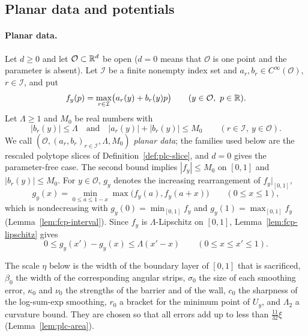 \subsection{Planar data and potentials}\label{sec:plc-potentials}

\paragraph{Planar data.} Let $d\ge0$ and let $\mathcal O\subset\mathbb{R}^d$ be open ($d=0$ means that $\mathcal O$ is one point
and the parameter is absent). Let $\mathcal I$ be a finite nonempty index set and $a_r,b_r\in C^\infty(\mathcal O)$,
$r\in\mathcal I$, and put
\begin{equation}\label{eq:plc-f}
 f_y(p)=\max_{r\in\mathcal I}\bigl(a_r(y)+b_r(y)p\bigr)\qquad(y\in\mathcal O,\ p\in\mathbb{R}).
\end{equation}
Let $\Lambda\ge1$ and $M_0$ be real numbers with
\[
 |b_r(y)|\le\Lambda\quad\text{and}\quad|a_r(y)|+|b_r(y)|\le M_0\qquad(r\in\mathcal I,\ y\in\mathcal O).
\]
We call $(\mathcal O,(a_r,b_r)_{r\in\mathcal I},\Lambda,M_0)$ \emph{planar data}; the families used below are the
rescaled polytope slices of Definition~\ref{def:plc-slice}, and $d=0$ gives the parameter-free case. The second bound
implies $|f_y|\le M_0$ on $[0,1]$ and $|b_r(y)|\le M_0$. For $y\in\mathcal O$, $g_y$ denotes the increasing
rearrangement of $f_y|_{[0,1]}$,
\[
 g_y(x)=\min_{0\le a\le1-x}\max\bigl(f_y(a),f_y(a+x)\bigr)\qquad(0\le x\le1),
\]
which is nondecreasing with $g_y(0)=\min_{[0,1]}f_y$ and $g_y(1)=\max_{[0,1]}f_y$ (Lemma~\ref{lem:fcp-interval}). Since $f_y$
is $\Lambda$-Lipschitz on $[0,1]$, Lemma~\ref{lem:fcp-lipschitz} gives
\begin{equation}\label{eq:plc-glip}
 0\le g_y(x')-g_y(x)\le\Lambda(x'-x)\qquad(0\le x\le x'\le1).
\end{equation}

The scale $\eta$ below is the width of the boundary layer of $[0,1]$ that is sacrificed, $\beta_0$ the width of the
corresponding angular strips, $\sigma_0$ the size of each smoothing error, $\kappa_0$ and $\nu_0$ the strengths of the
barrier and of the wall, $c_0$ the sharpness of the log-sum-exp smoothing, $r_0$ a bracket for the minimum point of
$U_y$, and $\Lambda_2$ a curvature bound. They are chosen so that all errors add up to less than $\frac{11}{32}\xi$
(Lemma~\ref{lem:plc-area}).

